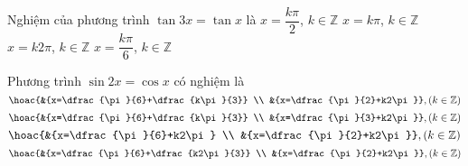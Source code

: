 \begin{ex}%
	Nghiệm của phương trình $\tan 3 x=\tan x$ là 
	 \choice
		{$x=\dfrac{k \pi}{2}$, $  k \in \mathbb{Z}$}
		{\True $x=k  \pi$, $ k \in \mathbb{Z}$}
		{$x=k 2 \pi$, $  k \in \mathbb{Z}$}
		{$x=\dfrac{k \pi}{6}$, $  k \in \mathbb{Z}$}
\end{ex}

\begin{ex}%
	Phương trình $\sin 2x=\cos x$  có nghiệm là
	\choice 
		{\True  $\hoac{&{x=\dfrac{\pi}{6}+\dfrac{k\pi}{3}} \\
		&{x=\dfrac{\pi}{2}+k2\pi}},  \left(k\in \mathbb{Z}\right)$}
		{$\hoac{&{x=\dfrac{\pi}{6}+\dfrac{k\pi}{3}} \\ 
		 &{x=\dfrac{\pi}{3}+k2\pi}}, \left(k\in \mathbb{Z}\right)$}
		{$\hoac{&{x=\dfrac{\pi}{6}+k2\pi} \\ 
		&{x=\dfrac{\pi}{2}+k2\pi}}, \left(k\in  \mathbb{Z}\right)$}
		 {$\hoac{&{x=\dfrac{\pi}{6}+\dfrac{k2\pi}{3}} \\
		&{x=\dfrac{\pi}{2}+k2\pi}}, \left(k\in  \mathbb{Z}\right)$}
\end{ex}

